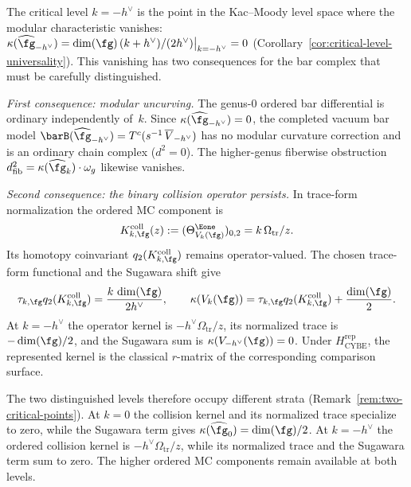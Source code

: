 \begin{remark}
\label{rem:critical-level-theta}
\ClaimStatusConditional
{}
The critical level $k = -h^\vee$ is the point in the
Kac--Moody level space where the modular characteristic vanishes:
$\kappa(\widehat{\fg}_{-h^\vee}) = \dim(\fg)\,(k + h^\vee)/(2h^\vee)\big|_{k=-h^\vee} = 0$
(Corollary~\ref{cor:critical-level-universality}).
This vanishing has two consequences for the bar complex that must be
carefully distinguished.

\emph{First consequence: modular uncurving.} The genus-$0$ ordered
bar differential is ordinary independently of~$k$. Since
$\kappa(\widehat{\fg}_{-h^\vee}) = 0$, the completed vacuum bar model
$\barB(\widehat{\fg}_{-h^\vee}) = T^c(s^{-1}\,\overline{V}_{-h^\vee})$
has no modular curvature correction and is an ordinary chain complex
($d^2 = 0$). The higher-genus fiberwise
obstruction $d_{\mathrm{fib}}^2 = \kappa(\widehat{\fg}_k) \cdot \omega_g$ likewise
vanishes.

\emph{Second consequence: the binary collision operator persists.}
In trace-form normalization the ordered MC component is
\[
 K_{k,\fg}^{\mathrm{coll}}(z)
 :=(\Theta_{V_k(\fg)}^{\Eone})_{0,2}
 =k\,\Omega_{\mathrm{tr}}/z.
\]
Its homotopy coinvariant
$q_2(K_{k,\fg}^{\mathrm{coll}})$ remains operator-valued.  The chosen
trace-form functional and the Sugawara shift give
\[
 \tau_{k,\fg}q_2(K_{k,\fg}^{\mathrm{coll}})
 =\frac{k\,\dim(\fg)}{2h^\vee},
 \qquad
 \kappa(V_k(\fg))
 =\tau_{k,\fg}q_2(K_{k,\fg}^{\mathrm{coll}})
 +\frac{\dim(\fg)}2.
\]
At $k=-h^\vee$ the operator kernel is
$-h^\vee\Omega_{\mathrm{tr}}/z$, its normalized trace is
$-\dim(\fg)/2$, and the Sugawara sum is
$\kappa(V_{-h^\vee}(\fg))=0$.  Under
$H_{\mathrm{CYBE}}^{\mathrm{rep}}$, the represented kernel is the
classical $r$-matrix of the corresponding comparison surface.

The two distinguished levels therefore occupy different strata
(Remark~\ref{rem:two-critical-points}).  At $k=0$ the collision
kernel and its normalized trace specialize to zero, while the
Sugawara term gives $\kappa(\widehat{\fg}_0)=\dim(\fg)/2$.  At
$k=-h^\vee$ the ordered collision kernel is
$-h^\vee\Omega_{\mathrm{tr}}/z$, while its normalized trace and the
Sugawara term sum to zero.  The higher ordered MC components remain
available at both levels.


\end{remark}
